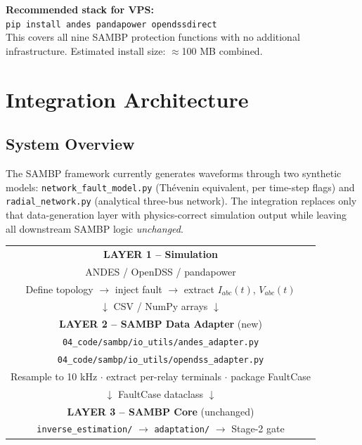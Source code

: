 \documentclass[11pt,a4paper]{article}
\begin{document}
\begin{infobox}
\textbf{Recommended stack for VPS:}\\[4pt]
\texttt{pip install andes pandapower opendssdirect}\\[4pt]
This covers all nine SAMBP protection functions with no additional
infrastructure. Estimated install size: $\approx$100 MB combined.
\end{infobox}

\section{Integration Architecture}

\subsection{System Overview}

The SAMBP framework currently generates waveforms through two synthetic
models: \texttt{network\_fault\_model.py} (Th\'evenin equivalent, per
time-step flags) and \texttt{radial\_network.py} (analytical three-bus
network). The integration replaces only that data-generation layer with
physics-correct simulation output while leaving all downstream SAMBP
logic \textit{unchanged}.

\begin{center}
\renewcommand{\arraystretch}{1.4}
\begin{tabular}{|c|}
\hline
\textbf{LAYER 1 -- Simulation}\\
ANDES / OpenDSS / pandapower\\
Define topology $\to$ inject fault $\to$ extract $I_{abc}(t)$, $V_{abc}(t)$\\
\hline
$\downarrow$ \quad CSV / NumPy arrays \quad $\downarrow$ \\
\hline
\textbf{LAYER 2 -- SAMBP Data Adapter} (new)\\
\texttt{04\_code/sambp/io\_utils/andes\_adapter.py}\\
\texttt{04\_code/sambp/io\_utils/opendss\_adapter.py}\\
Resample to 10 kHz $\cdot$ extract per-relay terminals $\cdot$ package FaultCase\\
\hline
$\downarrow$ \quad FaultCase dataclass \quad $\downarrow$ \\
\hline
\textbf{LAYER 3 -- SAMBP Core} (unchanged)\\
\texttt{inverse\_estimation/} $\to$ \texttt{adaptation/} $\to$ Stage-2 gate\\
\hline
\end{tabular}
\end{center}
\end{document}

